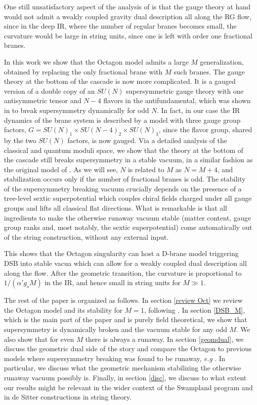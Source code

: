 \documentclass[a4paper,12pt]{article}
\begin{document}
One still unsatisfactory aspect of the analysis of \cite{Argurio:2020dkg,Argurio:2020npm} is that the gauge theory at hand would not admit a weakly coupled gravity dual description all along the RG flow, since in the deep IR, where the number of regular branes becomes small, the curvature would be large in string units, since one is left with order one fractional branes.  

In this work we show that the Octagon model admits a large $M$ generalization, obtained by replacing the only fractional brane with $M$ such branes. The gauge theory at the bottom of the cascade is now more complicated. It is a gauged version of a double copy of an $SU(N)$ supersymmetric gauge theory with one antisymmetric tensor and $N-4$ flavors in the antifundamental, which was shown in \cite{Affleck:1984xz} to break supersymmetry dynamically for odd $N$. In fact, in our case the IR dynamics of the brane system is described by a model with three gauge group factors, $G= SU(N)_1 \times SU(N-4)_2 \times SU(N)_3$, since the flavor group, shared by the two $SU(N)$ factors, is now gauged. Via a detailed analysis of the classical and quantum moduli space, we show that the theory at the bottom of the cascade still breaks supersymmetry in a stable vacuum, in a similar fashion as the original model of \cite{Affleck:1984xz}. As we will see, $N$ is related to $M$ as $N=M+4$, and stabilization occurs only if the number of fractional branes is odd. The stability of the supersymmetry breaking vacuum  crucially depends on the presence of a tree-level sextic superpotential which couples chiral fields charged under all gauge groups and lifts all classical flat directions. What is remarkable is that all ingredients to make the otherwise runaway vacuum stable (matter content, gauge group ranks and, most notably, the sextic superpotential) come automatically out of the string construction, without any external input.  

This shows that the Octagon singularity can host a D-brane model triggering DSB into stable vacua which can allow for a weakly coupled dual description all along the flow. After the geometric transition, the curvature is proportional to $1/(\alpha' g_s M)$ in the IR, and hence small in string units for $M \gg 1$.  

The rest of the paper is organized as follows. 
In section \ref{review Oct} we review the Octagon model and its stability for $M=1$, following  \cite{Argurio:2020dkg}.  In section \ref{DSB_M}, which is the main part of the paper and is purely field theoretical, we show that supersymmetry is dynamically broken and the vacuum stable for any odd $M$. We also show that for even $M$ there is always a runaway. In section \ref{geomdual}, we discuss the geometric dual side of the story and compare the Octagon to previous models where supersymmetry breaking was found to be runaway, {\it e.g} \cite{Berenstein:2005xa,Franco:2005zu,Bertolini:2005di}. In particular, we discuss what the geometric mechanism stabilizing the otherwise runaway vacuum possibly is. Finally, in section \ref{disc}, we discuss to what extent our results might be relevant in the wider context of the Swampland program and in de Sitter constructions in string theory. 
\end{document}
